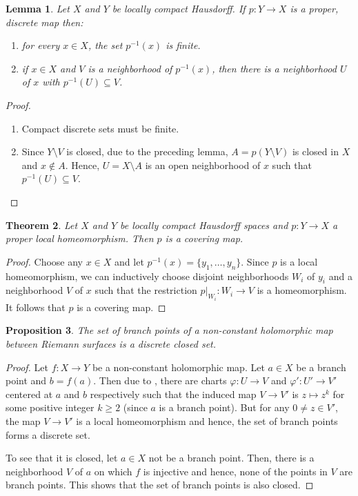 \documentclass[12pt]{article}
\theoremstyle{thmstyle}
\newtheorem{theorem}{Theorem}[section]
\newtheorem{lemma}[theorem]{Lemma}
\newtheorem{proposition}[theorem]{Proposition}
\theoremstyle{defstyle}
\renewcommand{\ge}{\geqslant}
\begin{document}
\begin{lemma}
    Let $X$ and $Y$ be locally compact Hausdorff. If $p: Y\to X$ is a proper, discrete map then:
    \begin{enumerate}[label=(\alph*)]
        \item for every $x\in X$, the set $p^{-1}(x)$ is finite. 
        \item if $x\in X$ and $V$ is a neighborhood of $p^{-1}(x)$, then there is a neighborhood $U$ of $x$ with $p^{-1}(U)\subseteq V$.
    \end{enumerate}
\end{lemma}
\begin{proof}
\begin{enumerate}[label=(\alph*)]
    \item Compact discrete sets must be finite. 
    \item Since $Y\setminus V$ is closed, due to the preceding lemma, $A = p(Y\setminus V)$ is closed in $X$ and $x\notin A$. Hence, $U = X\setminus A$ is an open neighborhood of $x$ such that $p^{-1}(U)\subseteq V$.        \qedhere
\end{enumerate}
\end{proof}

\begin{theorem}
    Let $X$ and $Y$ be locally compact Hausdorff spaces and $p: Y\to X$ a proper local homeomorphism. Then $p$ is a covering map.
\end{theorem}
\begin{proof}
    Choose any $x\in X$ and let $p^{-1}(x) = \{y_1,\dots, y_n\}$. Since $p$ is a local homeomorphism, we can inductively choose disjoint neighborhoods $W_i$ of $y_i$ and a neighborhood $V$ of $x$ such that the restriction $p|_{W_i}: W_i\to V$ is a homeomorphism. It follows that $p$ is a covering map.
\end{proof}

\begin{proposition}
    The set of branch points of a non-constant holomorphic map between Riemann surfaces is a discrete closed set.
\end{proposition}
\begin{proof}
    Let $f: X\to Y$ be a non-constant holomorphic map. Let $a\in X$ be a branch point and $b = f(a)$. Then due to , there are charts $\varphi: U\to V$ and $\varphi': U'\to V'$ centered at $a$ and $b$ respectively such that the induced map $V\to V'$ is $z\mapsto z^k$ for some positive integer $k\ge 2$ (since $a$ is a branch point). But for any $0\ne z\in V'$, the map $V\to V'$ is a local homeomorphism and hence, the set of branch points forms a discrete set.

    To see that it is closed, let $a\in X$ not be a branch point. Then, there is a neighborhood $V$ of $a$ on which $f$ is injective and hence, none of the points in $V$ are branch points. This shows that the set of branch points is also closed.
\end{proof}
\end{document}
